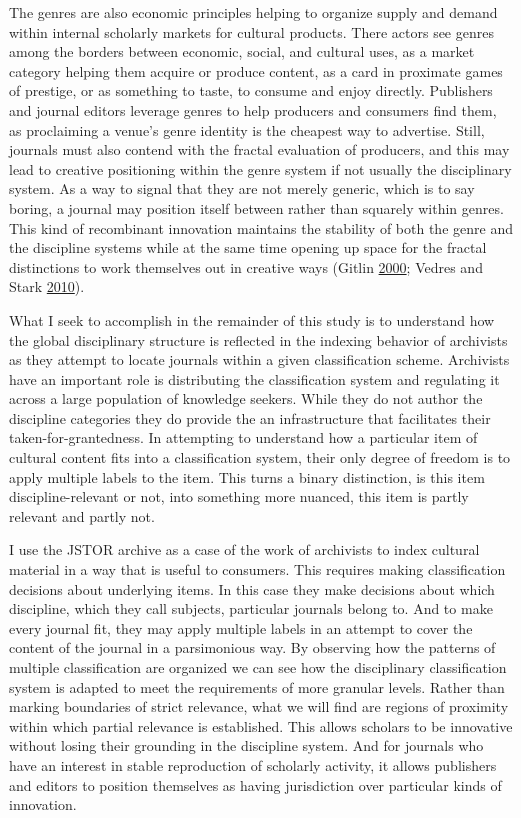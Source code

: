 \documentclass[]{book}
\theoremstyle{definition}
\theoremstyle{definition}
\theoremstyle{definition}
\theoremstyle{remark}
\begin{document}
The genres are also economic principles helping to organize supply and
demand within internal scholarly markets for cultural products. There
actors see genres among the borders between economic, social, and
cultural uses, as a market category helping them acquire or produce
content, as a card in proximate games of prestige, or as something to
taste, to consume and enjoy directly. Publishers and journal editors
leverage genres to help producers and consumers find them, as
proclaiming a venue's genre identity is the cheapest way to advertise.
Still, journals must also contend with the fractal evaluation of
producers, and this may lead to creative positioning within the genre
system if not usually the disciplinary system. As a way to signal that
they are not merely generic, which is to say boring, a journal may
position itself between rather than squarely within genres. This kind of
recombinant innovation maintains the stability of both the genre and the
discipline systems while at the same time opening up space for the
fractal distinctions to work themselves out in creative ways (Gitlin
\protect\hyperlink{ref-Gitlin2000Triumph}{2000}; Vedres and Stark
\protect\hyperlink{ref-Vedres2010Structural}{2010}).

What I seek to accomplish in the remainder of this study is to
understand how the global disciplinary structure is reflected in the
indexing behavior of archivists as they attempt to locate journals
within a given classification scheme. Archivists have an important role
is distributing the classification system and regulating it across a
large population of knowledge seekers. While they do not author the
discipline categories they do provide the an infrastructure that
facilitates their taken-for-grantedness. In attempting to understand how
a particular item of cultural content fits into a classification system,
their only degree of freedom is to apply multiple labels to the item.
This turns a binary distinction, is this item discipline-relevant or
not, into something more nuanced, this item is partly relevant and
partly not.

I use the JSTOR archive as a case of the work of archivists to index
cultural material in a way that is useful to consumers. This requires
making classification decisions about underlying items. In this case
they make decisions about which discipline, which they call subjects,
particular journals belong to. And to make every journal fit, they may
apply multiple labels in an attempt to cover the content of the journal
in a parsimonious way. By observing how the patterns of multiple
classification are organized we can see how the disciplinary
classification system is adapted to meet the requirements of more
granular levels. Rather than marking boundaries of strict relevance,
what we will find are regions of proximity within which partial
relevance is established. This allows scholars to be innovative without
losing their grounding in the discipline system. And for journals who
have an interest in stable reproduction of scholarly activity, it allows
publishers and editors to position themselves as having jurisdiction
over particular kinds of innovation.
\end{document}
